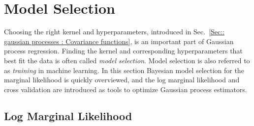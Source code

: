 \documentclass[twoside,english]{uiofysmaster}
\begin{document}
{\section{Model Selection}

Choosing the right kernel and hyperparameters, introduced in Sec.~\ref{Sec:: gaussian processes : Covariance functions}, is an important part of Gaussian process regression. Finding the  kernel and corresponding hyperparameters that best fit the data is often called \textit{model selection}. Model selection is also referred to as \textit{training} in machine learning. In this section Bayesian model selection for the marginal likelihood is quickly overviewed, and the log marginal likelihood and cross validation are introduced as tools to optimize Gaussian process estimators.

\subsection{Log Marginal Likelihood}\label{Sec:: gaussian process : Log Marginal Likelihood}

}
\end{document}
